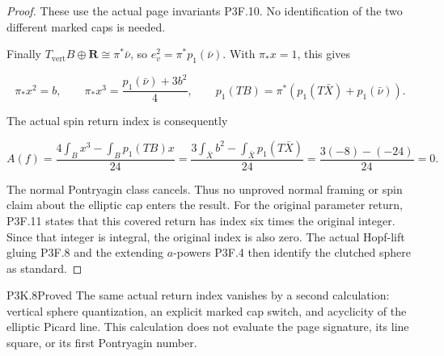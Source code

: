 \begin{proof}
These use the actual page invariants P3F.10.  No identification of
the two different marked caps is needed.

Finally \(T_{\mathrm{vert}}B\oplus\mathbf R\cong\pi^*\bar\nu\),
so \(e_v^2=\pi^*p_1(\bar\nu)\).  With \(\pi_*x=1\), this gives

\[
 \pi_*x^2=b,\qquad
 \pi_*x^3=\frac{p_1(\bar\nu)+3b^2}{4},\qquad
 p_1(TB)=\pi^*(p_1(T\bar X)+p_1(\bar\nu)).
\]

The actual spin return index is consequently

\[
 A(f)=\frac{4\int_Bx^3-\int_Bp_1(TB)x}{24}
     =\frac{3\int_{\bar X}b^2-\int_{\bar X}p_1(T\bar X)}{24}
     =\frac{3(-8)-(-24)}{24}=0.
\]

The normal Pontryagin class cancels.  Thus no unproved normal
framing or spin claim about the elliptic cap enters the result.
For the original parameter return, P3F.11 states that this covered
return has index six times the original integer.  Since that
integer is integral, the original index is also zero.  The actual
Hopf-lift gluing P3F.8 and the extending \(a\)-powers P3F.4 then
identify the clutched sphere as standard.
\end{proof}

\begin{statement}{P3K.8}{Proved}
The same actual return index vanishes by a second calculation: vertical sphere quantization, an explicit marked cap switch, and acyclicity of the elliptic Picard line.  This calculation does not evaluate the page signature, its line square, or its first Pontryagin number.
\end{statement}

